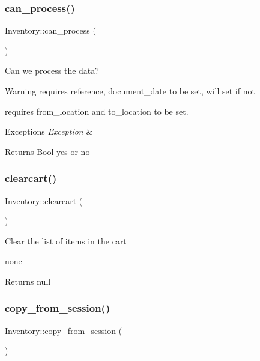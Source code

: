 \subsubsection{\texorpdfstring{can\+\_\+process()}{can\_process()}}
{\footnotesize\ttfamily Inventory\+::can\+\_\+process (\begin{DoxyParamCaption}{ }\end{DoxyParamCaption})}

Can we process the data? \begin{DoxyWarning}{Warning}
requires reference, document\+\_\+date to be set, will set if not 

requires from\+\_\+location and to\+\_\+location to be set. 
\end{DoxyWarning}

\begin{DoxyExceptions}{Exceptions}
{\em Exception} & \\
\hline
\end{DoxyExceptions}
\begin{DoxyReturn}{Returns}
Bool yes or no 
\end{DoxyReturn}
\hypertarget{class_inventory_a2ff0a0bf19271240f31d948ac2373141}{}\label{class_inventory_a2ff0a0bf19271240f31d948ac2373141} 
\subsubsection{\texorpdfstring{clearcart()}{clearcart()}}
{\footnotesize\ttfamily Inventory\+::clearcart (\begin{DoxyParamCaption}{ }\end{DoxyParamCaption})}

Clear the list of items in the cart

none \begin{DoxyReturn}{Returns}
null 
\end{DoxyReturn}
\hypertarget{class_inventory_a47208c8f736cae33d5293f0c160266cb}{}\label{class_inventory_a47208c8f736cae33d5293f0c160266cb} 
\subsubsection{\texorpdfstring{copy\+\_\+from\+\_\+session()}{copy\_from\_session()}}
{\footnotesize\ttfamily Inventory\+::copy\+\_\+from\+\_\+session (\begin{DoxyParamCaption}{ }\end{DoxyParamCaption})}

